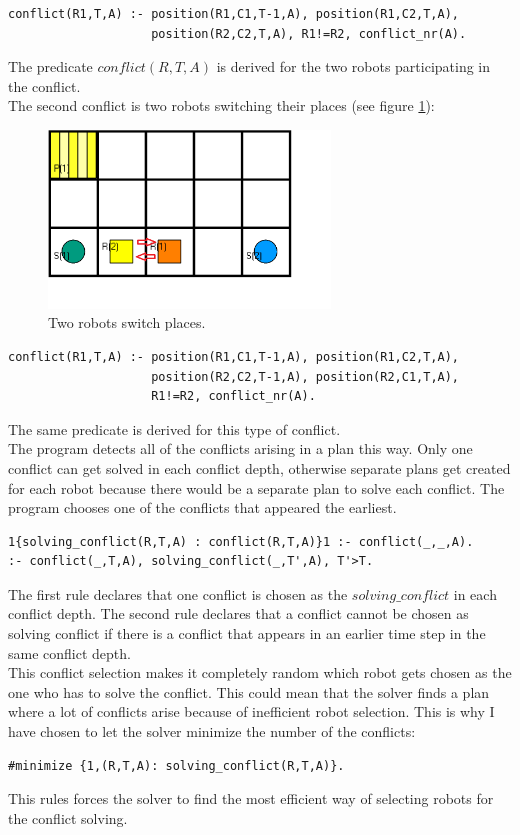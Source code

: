 \documentclass[runningheads]{llncs}
\begin{document}
\begin{verbatim}
conflict(R1,T,A) :- position(R1,C1,T-1,A), position(R1,C2,T,A), 
                    position(R2,C2,T,A), R1!=R2, conflict_nr(A).
\end{verbatim}
The predicate $conflict(R,T,A)$ is derived for the two robots participating in the conflict. \\
The second conflict is two robots switching their places (see figure \ref{fig:c2}):

\begin{figure}[h]
\includegraphics[width=75mm]{Images/Conflict 2}
\caption{Two robots switch places.}
\label{fig:c2}
\end{figure}

\begin{verbatim}
conflict(R1,T,A) :- position(R1,C1,T-1,A), position(R1,C2,T,A), 
                    position(R2,C2,T-1,A), position(R2,C1,T,A), 
                    R1!=R2, conflict_nr(A).
\end{verbatim}
The same predicate is derived for this type of conflict. \\
The program detects all of the conflicts arising in a plan this way. Only one conflict can get solved in each conflict depth, otherwise separate plans get created for each robot because there would be a separate plan to solve each conflict. The program chooses one of the conflicts that appeared the earliest.
\begin{verbatim}
1{solving_conflict(R,T,A) : conflict(R,T,A)}1 :- conflict(_,_,A).
:- conflict(_,T,A), solving_conflict(_,T',A), T'>T.
\end{verbatim}
The first rule declares that one conflict is chosen as the $solving\_conflict$ in each conflict depth. The second rule declares that a conflict cannot be chosen as solving conflict if there is a conflict that appears in an earlier time step in the same conflict depth. \\
This conflict selection makes it completely random which robot gets chosen as the one who has to solve the conflict. This could mean that the solver finds a plan where a lot of conflicts arise because of inefficient robot selection. This is why I have chosen to let the solver minimize the number of the conflicts:
\begin{verbatim}
#minimize {1,(R,T,A): solving_conflict(R,T,A)}.
\end{verbatim}
This rules forces the solver to find the most efficient way of selecting robots for the conflict solving.
\end{document}

